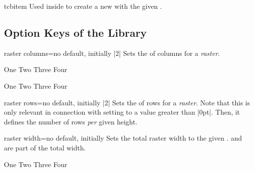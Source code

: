 \begin{docCommand}[doc new=2014-11-10]{tcbitem}{}
  Used inside  to create a new 
  with the given .
\end{docCommand}


\clearpage
\subsection{Option Keys of the Library}\label{subsec:raster_options}

\begin{docTcbKey}[][doc new=2014-11-10]{raster columns}{=}{no default, initially |2|}
  Sets the  of columns for a \emph{raster}.
\begin{dispExample}
\begin{tcbitemize}[raster columns=3,
  size=small,colframe=red!50!black,colback=red!10!white]
  \tcbitem One
  \tcbitem Two
  \tcbitem Three
  \tcbitem Four
\end{tcbitemize}
\begin{tcbitemize}[raster columns=4,
  size=small,colframe=blue!50!black,colback=blue!10!white]
  \tcbitem One
  \tcbitem Two
  \tcbitem Three
  \tcbitem Four
\end{tcbitemize}
\end{dispExample}
\end{docTcbKey}

\begin{docTcbKey}[][doc new=2014-11-10]{raster rows}{=}{no default, initially |2|}
  Sets the  of rows for a \emph{raster}.
  Note that this is only relevant in connection with setting 
  to a value greater than |0pt|. Then, it defines the number of rows \emph{per} given
  height.
\end{docTcbKey}


\begin{docTcbKey}[][doc new=2014-11-10]{raster width}{=}{no default, initially }
  Sets the total raster width to the given .
   and  are part
  of the total width.
\begin{dispExample}
\begin{tcbitemize}[raster width=\linewidth/2,
  size=small,colframe=red!50!black,colback=red!10!white]
  \tcbitem One
  \tcbitem Two
  \tcbitem Three
  \tcbitem Four
\end{tcbitemize}
\end{dispExample}
\end{docTcbKey}


